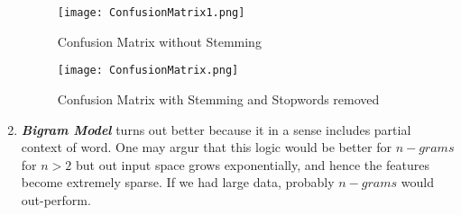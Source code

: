 \documentclass{article}
\newcommand{\italb}[1]{\textbf{\textit{#1}}}
\begin{document}
\begin{enumerate}
\begin{figure}[h]
\vspace*{-2cm}
\centering
\texttt{[image: ConfusionMatrix1.png]}
\caption{Confusion Matrix without Stemming}
\end{figure}
\begin{figure}[h]
\vspace*{-2cm}
\centering
\texttt{[image: ConfusionMatrix.png]}
\caption{Confusion Matrix with Stemming and Stopwords removed}
\end{figure}
\clearpage
\item \italb{Bigram Model} turns out better because it in a sense includes partial context of word. One may argur that this logic would be better for $n-grams$ for $n>2$ but out input space grows exponentially, and hence the features become extremely sparse. If we had large data, probably $n-grams$ would out-perform.
\end{enumerate}
\end{document}
